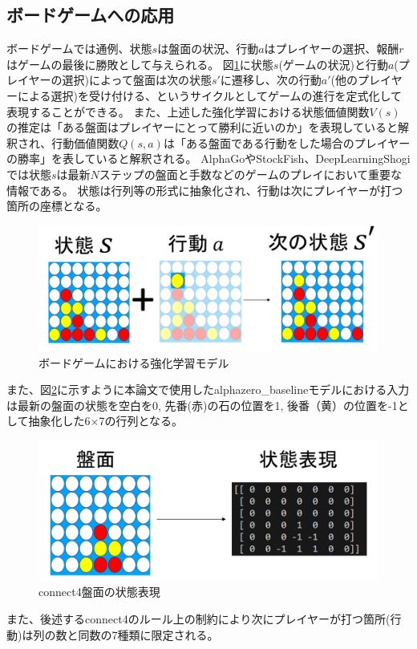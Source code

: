 \subsection{ボードゲームへの応用}
ボードゲームでは通例、状態$s$は盤面の状況、行動$a$はプレイヤーの選択、報酬$r$はゲームの最後に勝敗として与えられる。
図\ref{fig:board-game-model}に状態$s$(ゲームの状況)と行動$a$(プレイヤーの選択)によって盤面は次の状態$s'$に遷移し、次の行動$a'$(他のプレイヤーによる選択)を受け付ける、というサイクルとしてゲームの進行を定式化して表現することができる。
また、上述した強化学習における状態価値関数$V(s)$の推定は「ある盤面はプレイヤーにとって勝利に近いのか」を表現していると解釈され、行動価値関数$Q(s, a)$は「ある盤面である行動をした場合のプレイヤーの勝率」を表していると解釈される。
AlphaGo\cite{AlphaGo}やStockFish\cite{StockFish12}、DeepLearningShogi\cite{dlshogi}では状態$s$は最新$N$ステップの盤面と手数などのゲームのプレイにおいて重要な情報である。
状態は行列等の形式に抽象化され、行動は次にプレイヤーが打つ箇所の座標となる。
\begin{figure}[t]
	\includegraphics[width=\linewidth]{./figure/transition.png}
	\caption{ボードゲームにおける強化学習モデル}
	\label{fig:board-game-model}
\end{figure}

また、図\ref{fig:connect4-symbol}に示すように本論文で使用したalphazero\_baselineモデル\cite{baseline}における入力は最新の盤面の状態を空白を0, 先番(赤)の石の位置を1, 後番（黄）の位置を-1として抽象化した6$\times$7の行列となる。
\begin{figure}[t]
	\centering
	\includegraphics[width=\linewidth]{./figure/symbolic.png}
	\caption{connect4盤面の状態表現}
	\label{fig:connect4-symbol}
\end{figure}
また、後述するconnect4のルール上の制約により次にプレイヤーが打つ箇所(行動)は列の数と同数の7種類に限定される。

